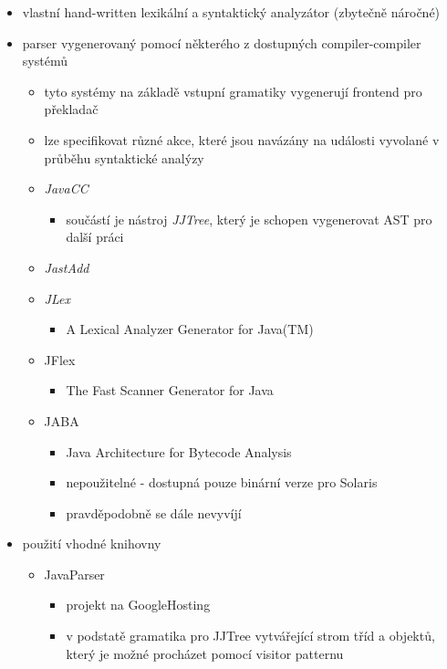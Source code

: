 \begin{itemize}
\item vlastní hand-written lexikální a syntaktický analyzátor (zbytečně náročné)
\item parser vygenerovaný pomocí některého z dostupných compiler-compiler systémů
  \begin{itemize}
  \item tyto systémy na základě vstupní gramatiky vygenerují frontend pro překladač
  \item lze specifikovat různé akce, které jsou navázány na události vyvolané v průběhu syntaktické analýzy
  \item \emph{JavaCC} \cite{parsertools:javacc}
    \begin{itemize}
    \item součástí je nástroj \emph{JJTree}, který je schopen vygenerovat AST pro další práci
    \end{itemize}
  \item \emph{JastAdd} \cite {parsertools:jastadd}
  \item \emph{JLex} \cite{parsertools:jlex}
    \begin{itemize}
    \item A Lexical Analyzer Generator for Java(TM)
    \end{itemize}
  \item JFlex \cite{parsertools:jflex}
    \begin{itemize}
    \item The Fast Scanner Generator for Java
    \end{itemize}
  \item JABA \cite{parsertools:jaba}
    \begin{itemize}
    \item Java Architecture for Bytecode Analysis
    \item nepoužitelné - dostupná pouze binární verze pro Solaris
    \item pravděpodobně se dále nevyvíjí
    \end{itemize}
  \end{itemize}
\item použití vhodné knihovny
  \begin{itemize}
  \item JavaParser \cite{parsertools:javaparser}
    \begin{itemize}
    \item projekt na GoogleHosting
    \item v podstatě gramatika pro JJTree vytvářející strom tříd a objektů, který je možné procházet pomocí visitor patternu

\end{itemize}
\end{itemize}
\end{itemize}
